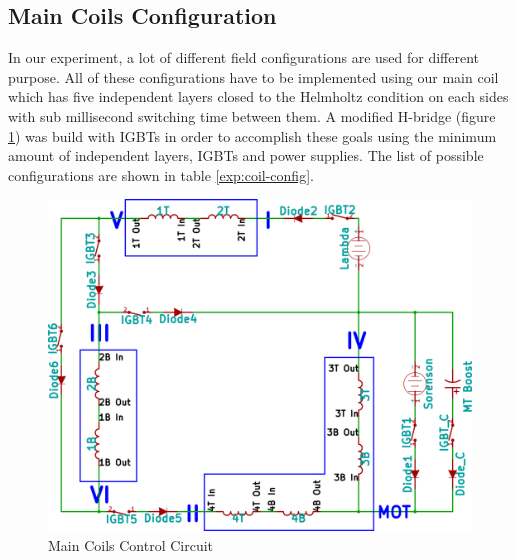 \subsection{Main Coils Configuration}\label{exp:coil}
In our experiment, a lot of different field configurations are used for different purpose. All of these configurations have to be implemented using our main coil which has five independent layers closed to the Helmholtz condition on each sides with sub millisecond switching time between them. A modified H-bridge (figure \ref{exp:coil-control}) was build with IGBTs in order to accomplish these goals using the minimum amount of independent layers, IGBTs and power supplies. The list of possible configurations are shown in table \ref{exp:coil-config}.
\begin{figure}
  \begin{center}
    \includegraphics[width=15cm]{coil.png}
  \end{center}
  \caption{Main Coils Control Circuit}
  \label{exp:coil-control}
\end{figure}
